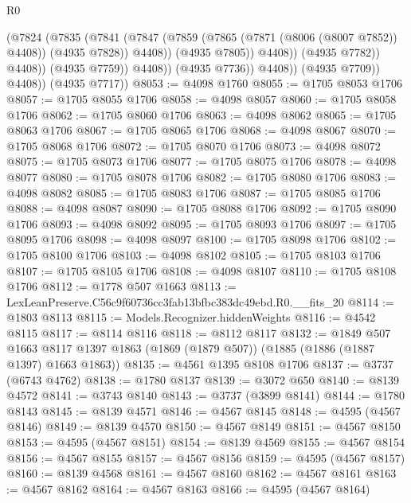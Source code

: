 \begin{lexlean}{R0}
\begin{coremodule}
                                (@7824
                                  (@7835
                                    (@7841
                                      (@7847
                                        (@7859
                                          (@7865 (@7871 (@8006 (@8007 @7852)) @4408))
                                          (@4935 @7828))
                                        @4408))
                                    (@4935 @7805))
                                  @4408))
                              (@4935 @7782))
                            @4408))
                        (@4935 @7759))
                      @4408))
                  (@4935 @7736))
                @4408))
            (@4935 @7709))
          @4408))
      (@4935 @7717))
@8053 := @4098 @1760
@8055 := @1705 @8053 @1706
@8057 := @1705 @8055 @1706
@8058 := @4098 @8057
@8060 := @1705 @8058 @1706
@8062 := @1705 @8060 @1706
@8063 := @4098 @8062
@8065 := @1705 @8063 @1706
@8067 := @1705 @8065 @1706
@8068 := @4098 @8067
@8070 := @1705 @8068 @1706
@8072 := @1705 @8070 @1706
@8073 := @4098 @8072
@8075 := @1705 @8073 @1706
@8077 := @1705 @8075 @1706
@8078 := @4098 @8077
@8080 := @1705 @8078 @1706
@8082 := @1705 @8080 @1706
@8083 := @4098 @8082
@8085 := @1705 @8083 @1706
@8087 := @1705 @8085 @1706
@8088 := @4098 @8087
@8090 := @1705 @8088 @1706
@8092 := @1705 @8090 @1706
@8093 := @4098 @8092
@8095 := @1705 @8093 @1706
@8097 := @1705 @8095 @1706
@8098 := @4098 @8097
@8100 := @1705 @8098 @1706
@8102 := @1705 @8100 @1706
@8103 := @4098 @8102
@8105 := @1705 @8103 @1706
@8107 := @1705 @8105 @1706
@8108 := @4098 @8107
@8110 := @1705 @8108 @1706
@8112 := @1778 @507 @1663
@8113 := LexLeanPreserve.C56c9f60736cc3fab13bfbc383dc49ebd.R0.__fits_20
@8114 := @1803 @8113
@8115 := Models.Recognizer.hiddenWeights
@8116 := @4542 @8115
@8117 := @8114 @8116
@8118 := @8112 @8117
@8132 := @1849
    @507
    @1663
    @8117
    @1397
    @1863
    (@1869 (@1879 @507))
    (@1885 (@1886 (@1887 @1397) @1663 @1863))
@8135 := @4561 @1395 @8108 @1706
@8137 := @3737 (@6743 @4762)
@8138 := @1780 @8137
@8139 := @3072 @650
@8140 := @8139 @4572
@8141 := @3743 @8140
@8143 := @3737 (@3899 @8141)
@8144 := @1780 @8143
@8145 := @8139 @4571
@8146 := @4567 @8145
@8148 := @4595 (@4567 @8146)
@8149 := @8139 @4570
@8150 := @4567 @8149
@8151 := @4567 @8150
@8153 := @4595 (@4567 @8151)
@8154 := @8139 @4569
@8155 := @4567 @8154
@8156 := @4567 @8155
@8157 := @4567 @8156
@8159 := @4595 (@4567 @8157)
@8160 := @8139 @4568
@8161 := @4567 @8160
@8162 := @4567 @8161
@8163 := @4567 @8162
@8164 := @4567 @8163
@8166 := @4595 (@4567 @8164)

\end{coremodule}
\end{lexlean}

